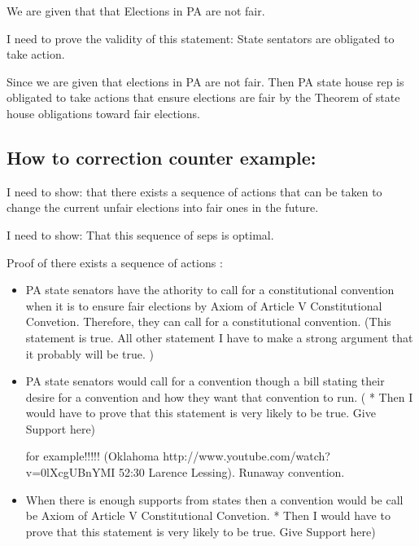 \documentclass[11pt]{article} %
\begin{document}
\begin{enumerate}
We are given that that Elections in PA are not fair. 

I need to prove the validity of this statement: State sentators are obligated to take action. 

Since we are given that elections in PA are not fair.  Then  PA state house rep is obligated to take actions that ensure elections are fair by the Theorem of state house obligations toward fair elections.


\subsection{How to correction counter example:}


I need to show: that there exists a sequence of actions that can be taken to change the current unfair elections into fair ones in the future.  

I need to show: That this sequence of seps is optimal. 

Proof of there exists a sequence of actions : 
\begin{itemize}

\item PA state senators have the athority to call for a constitutional convention when it is to ensure fair elections by Axiom of Article V Constitutional Convetion.  Therefore, they can call for a constitutional convention. (This statement is true.  All other statement I have to make a strong argument that it probably will be true. )

	
\item  PA state senators would call for a convention though a bill stating their desire for a convention and how they want that convention to run.  ( * Then I would have to prove that this statement is very likely to be true.  Give Support here)

	for example!!!!! (Oklahoma http://www.youtube.com/watch?v=0lXcgUBnYMI  52:30   Larence Lessing).
	Runaway convention.

\item  When there is enough supports from states then a convention would be call be Axiom of Article V Constitutional Convetion.   * Then I would have to prove that this statement is very likely to be true.  Give Support here)



\end{itemize}
\end{enumerate}
\end{document}
